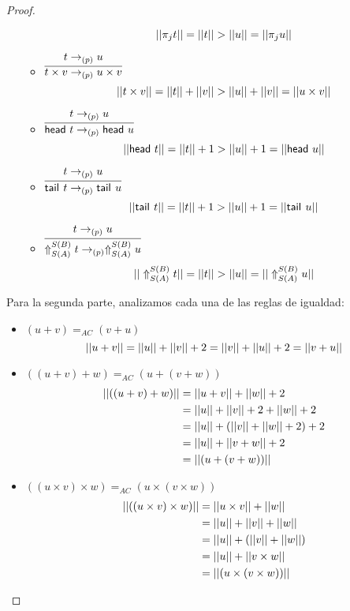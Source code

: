 \begin{proof}
\begin{itemize}
\begin{itemize}
          \[
            ||\pi_{j} t|| = ||t|| > ||u|| = ||\pi_{j} u||
          \]
        \item \( \infer{t \times v \reducesto_{(p)} u \times v}{t \reducesto_{(p)} u} \)
          \[
            ||t \times v|| = ||t|| + ||v|| > ||u|| + ||v|| = ||u \times v||
          \]
        \item \( \infer{\head{t} \reducesto_{(p)} \head{u}}{t \reducesto_{(p)} u} \)
          \[
            ||\mathsf{head}~t|| = ||t|| + 1 > ||u|| + 1 = ||\mathsf{head}~u||
          \]
        \item \( \infer{\tail{t} \reducesto_{(p)} \tail{u}}{t \reducesto_{(p)} u} \)
          \[
            ||\mathsf{tail}^{}~t|| = ||t|| + 1 > ||u|| + 1 = ||\mathsf{tail}^{}~u||
          \]
        \item \( \infer{\cast{S(A)}{S(B)} t \reducesto_{(p)} \cast{S(A)}{S(B)} u}{t \reducesto_{(p)} u} \)
          \[
            ||\Uparrow_{S(A)}^{S(B)} t|| = ||t|| > ||u|| = ||\Uparrow_{S(A)}^{S(B)} u||
          \]
      \end{itemize}
  \end{itemize}

  Para la segunda parte, analizamos cada una de las reglas de igualdad:
  \begin{itemize}
    \item \( (u + v) =_{AC} (v + u) \)
      \[
        ||u + v|| = ||u|| + ||v|| + 2 = ||v|| + ||u|| + 2 = ||v + u||
      \]
    \item \( ((u + v) + w) =_{AC} (u + (v + w)) \)
      \begin{equation*}
        \begin{split}
          ||((u + v) + w)||
          & = ||u + v|| + ||w|| + 2 \\
          & = ||u|| + ||v|| + 2 + ||w|| + 2 \\
          & = ||u|| + (||v|| + ||w|| + 2) + 2 \\
          & = ||u|| + ||v + w|| + 2 \\
          & = ||(u + (v + w))||
        \end{split}
      \end{equation*}
    \item \( ((u \times v) \times w) =_{AC} (u \times (v \times w)) \)
      \begin{equation*}
        \begin{split}
          ||((u \times v) \times w)||
          & = ||u \times v|| + ||w|| \\
          & = ||u|| + ||v|| + ||w|| \\
          & = ||u|| + (||v|| + ||w||) \\
          & = ||u|| + ||v \times w|| \\
          & = ||(u \times (v \times w))||
        \end{split}
      \end{equation*}
    \qedhere
  \end{itemize}
\end{proof}

